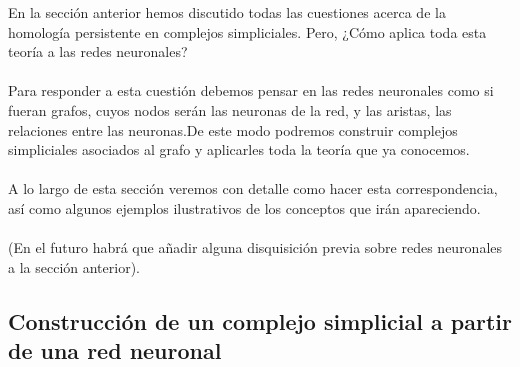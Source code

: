 \documentclass[12pt, a4paper]{article}
\numberwithin{equation}{section}
\theoremstyle{definition}
\theoremstyle{remark}
\theoremstyle{plain}
\begin{document}
		En la sección anterior hemos discutido todas las cuestiones 
		acerca de la homología persistente en complejos simpliciales. 
		Pero, ¿Cómo aplica toda esta teoría a las redes neuronales? \\
		\\
		Para responder a esta cuestión debemos pensar en las redes 
		neuronales como si fueran grafos, cuyos nodos serán las neuronas 
		de la red, y las aristas, las relaciones entre las neuronas.De 
		este modo podremos construir complejos simpliciales asociados 
		al grafo y aplicarles toda la teoría que ya conocemos. \\
		\\
		A lo largo de esta sección veremos con detalle como hacer esta 
		correspondencia, así como algunos ejemplos ilustrativos de los 
		conceptos que irán apareciendo.\\
		\\
		(En el futuro habrá que añadir alguna disquisición previa sobre redes neuronales a la sección anterior).

	\subsection{Construcción de un complejo simplicial a partir de una red neuronal}
\end{document}
